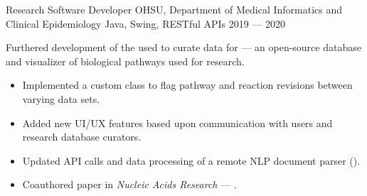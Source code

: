 \showoff
{Research Software Developer}
{OHSU, Department of Medical Informatics and Clinical Epidemiology}
{Java, Swing, RESTful APIs}
{2019 --- 2020}

Furthered development of the  used to curate data for  --- an open-source database and visualizer of biological pathways used for research.

\begin{itemize}[label=$\triangleright$]
    \item Implemented a custom class to flag pathway and reaction revisions between varying data sets.
    \item Added new UI/UX features based upon communication with users and research database curators.
    \item Updated API calls and data processing of a remote NLP document parser ().
    \item Coauthored paper in \emph{Nucleic Acids Research} --- .
\end{itemize}

